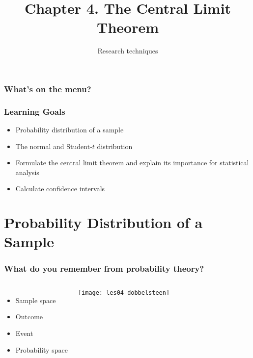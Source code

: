 \documentclass[aspectratio=169]{beamer}
\title{Chapter 4. The Central Limit Theorem}
\subtitle{Research techniques}
\begin{document}
\begin{frame}
  \maketitle
\end{frame}

\begin{frame}
  \frametitle{What's on the menu?}
  
  \tableofcontents
\end{frame}

\begin{frame}
  \frametitle{Learning Goals}
  
  \begin{itemize}
    \item Probability distribution of a sample
    \item The normal and Student-$t$ distribution
    \item Formulate the central limit theorem and explain its importance for statistical analysis
    \item Calculate confidence intervals
  \end{itemize}
\end{frame}

\section{Probability Distribution of a Sample}

\begin{frame}
  \frametitle{What do you remember from probability theory?}
  
  \begin{columns}
    \begin{itemize}
      \item Sample space
      \item Outcome
      \item Event
      \item Probability space
    \end{itemize}
    
    \centering
    \texttt{[image: les04-dobbelsteen]}
  \end{columns}
  
\end{frame}
\end{document}

